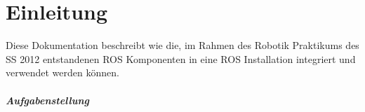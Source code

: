 \chapter{Einleitung}

Diese Dokumentation beschreibt wie die, im Rahmen des Robotik Praktikums des SS 2012 entstandenen ROS Komponenten in eine ROS Installation integriert und verwendet werden können.

\paragraph{Aufgabenstellung}

